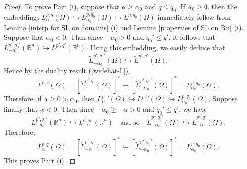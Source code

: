 \documentclass[reqno,centertags,11pt]{amsart}
\theoremstyle{definition}
\numberwithin{thm}{section}
\numberwithin{equation}{section}
\newcommand{\R}{{\mathbb{R}}}
\begin{document}
\begin{proof} To prove Part (i), suppose that $\alpha  \ge \alpha_0$  and $q \le q_0 $. If $\alpha_0 \ge 0$, then the embeddings   $ L_\alpha^{p,q}(\Omega )  \hookrightarrow    L_{\alpha_0}^{p,q_0 }(\Omega )\hookrightarrow    L^{p,q_0 }(\Omega )$  immediately follow    from Lemma \ref{interp for SL on domains} (i) and Lemma \ref{properties of SL on Rn} (i).
Suppose that $\alpha_0 < 0$. Then since $-\alpha_0 >  0$ and $q_0 '\le q'$, it follows that  $ L_{-\alpha_0}^{p',q_0'}(\R^n )  \hookrightarrow    L^{p',q '}(\R^n ) $. Using this embedding, we easily deduce that
$$
\widetilde{L}_{-\alpha_0}^{p',q_0 '}(\Omega )     \hookrightarrow  \widetilde{L}^{p',q'}(\Omega ).
$$
Hence by the duality result  (\ref{widehat-L}),
\[
L^{p,q}(\Omega )  = \left[ \widetilde{L}^{p',q'}(\Omega ) \right]^* \hookrightarrow \left[ \widetilde{L}_{-\alpha_0}^{p',q_0 '}(\Omega ) \right]^* = L_{\alpha_0}^{p,q_0 }(\Omega )   .
\]
Therefore, if $\alpha \ge 0 > \alpha_0$, then
$L_{\alpha}^{p,q  }(\Omega ) \hookrightarrow  L^{p,q}(\Omega )   \hookrightarrow L_{\alpha_0}^{p,q_0 }(\Omega )$.
Suppose finally that $\alpha < 0$.  Then since $-\alpha_0 \ge -\alpha > 0$ and $q_0 '\le q'$, we have
$$
L_{-\alpha_0}^{p',q_0'}(\R^n )  \hookrightarrow    L_{-\alpha}^{p',q '}(\R^n )
\quad\mbox{and so}\quad
\widetilde{L}_{-\alpha_0}^{p',q_0 '}(\Omega )  \hookrightarrow  \widetilde{L}_{-\alpha}^{p',q  '}(\Omega )   .
$$
Therefore,
\[
L_\alpha^{p,q}(\Omega )  = \left[ \widetilde{L}_{-\alpha}^{p',q'}(\Omega ) \right]^* \hookrightarrow \left[ \widetilde{L}_{-\alpha_0}^{p',q_0 '}(\Omega ) \right]^* = L_{\alpha_0}^{p,q_0 }(\Omega )  .
\]
This proves Part (i).


\end{proof}
\end{document}
